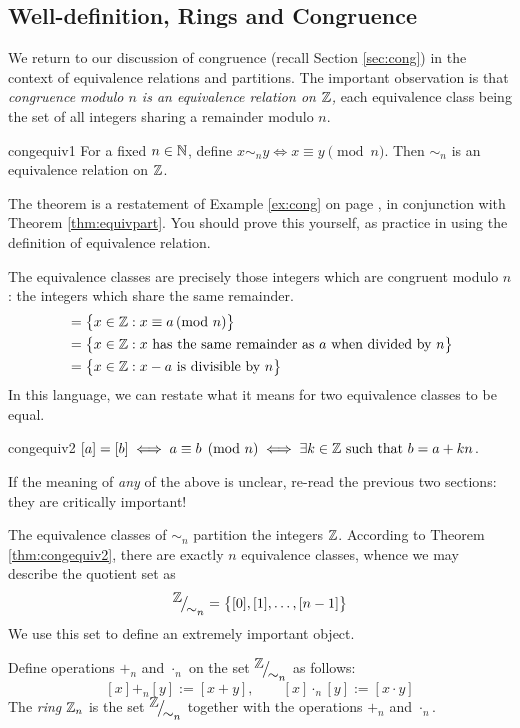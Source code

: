 \clearpage


\subsection{Well-definition, Rings and Congruence}\label{sec:welldefn}

We return to our discussion of congruence (recall Section \ref{sec:cong}) in the context of equivalence relations and partitions. The important observation is that \emph{congruence modulo $n$ is an equivalence relation on $\mathbb{Z}$,} each equivalence class being the set of all integers sharing a remainder modulo $n$.

\begin{thm}{}{congequiv1}
	For a fixed $n\in\mathbb{N}$, define $x\sim_n y\iff x\equiv y\pmod n$. Then $\sim_n$ is an equivalence relation on $\mathbb{Z}$.
\end{thm}

The theorem is a restatement of Example \ref{ex:cong} on page \pageref{ex:cong}, in conjunction with Theorem \ref{thm:equivpart}. You should prove this yourself, as practice in using the definition of equivalence relation.\par
The equivalence classes are precisely those integers which are congruent modulo $n$: the integers which share the same remainder.
\begin{align*}
	[a]&=\big\{x\in\Z:x\equiv a\spmod n\big\}\\
	&=\big\{x\in\Z:x\text{ has the same remainder as $a$ when divided by $n$}\big\}\\
	&=\big\{x\in\Z:x-a\text{ is divisible by $n$}\big\}
\end{align*}
In this language, we can restate what it means for two equivalence classes to be equal.

\begin{thm}{}{congequiv2}
	$[a]=[b]\iff a\equiv b\pmod n\iff \exists k\in\mathbb{Z}\text{ such that }b=a+kn$.
\end{thm}

If the meaning of \emph{any} of the above is unclear, re-read the previous two sections: they are critically important!\par
The equivalence classes of $\sim_n$ partition the integers $\mathbb{Z}$. According to Theorem \ref{thm:congequiv2}, there are exactly $n$ equivalence classes, whence we may describe the quotient set as
\[
	{}^{\textstyle {\mathbb{Z}}}\!\big/_{\textstyle \!{\sim_n}}=\big\{[0],[1],\ldots,[n-1]\big\}
\]
We use this set to define an extremely important object.

\begin{defn}{}{}
	Define operations $+_n$ and $\cdot_n$ on the set ${}^{\textstyle {\mathbb{Z}}}\!\big/_{\textstyle \!{\sim_n}}$ as follows:
	\[
		[x]+_n[y]:=[x+y],\qquad [x]\cdot_n[y]:=[x\cdot y]
	\]
	The \emph{ring} $\mathbb{Z}_n$ is the set ${}^{\textstyle {\mathbb{Z}}}\!\big/_{\textstyle \!{\sim_n}}$ together with the operations $+_n$ and $\cdot_n$.
\end{defn}

